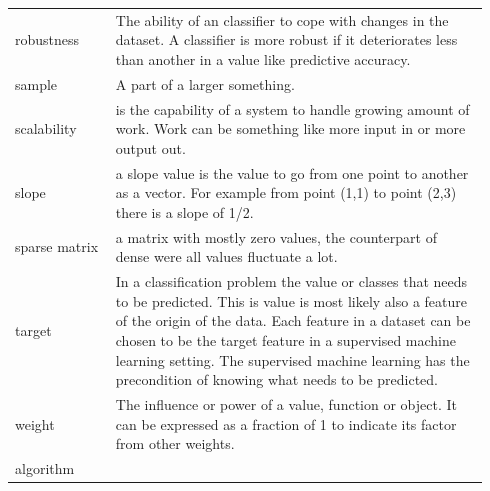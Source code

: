 \documentclass[a4paper,10pt]{article}
\begin{document}
\newpage
\begin{tabular}{ p{0.20\linewidth} p{0.7437\linewidth} }
	
	robustness &  The ability of an classifier to cope with changes in the dataset. A classifier is more robust if it deteriorates less than another in a value like predictive accuracy. \\ [1ex]	
	
	sample & A part of a larger something.\\ [1ex]
	
	scalability & is the capability of a system to handle growing amount of work. Work can be something like more input in or more output out. \\[1ex]	
	
	slope & a slope value is the value to go from one point to another as a vector. For example from point (1,1) to point (2,3) there is a slope of 1/2.\\[1ex]
	
	sparse matrix & a matrix with mostly zero values, the counterpart of dense were all values fluctuate a lot.	\\ [1ex]
	
	target & In a classification problem the value or classes that needs to be predicted. This is value is most likely also a feature of the origin of the data. Each feature in a dataset can be chosen to be the target feature in a supervised machine learning setting. The supervised machine learning has the precondition of knowing what needs to be predicted. \\ [+1ex]	
	
	weight & The influence or power of a value, function or object. It can be expressed as a fraction of 1 to indicate its factor from other weights.	\\ [1ex]
	
	
	
	
	
	
	algorithm & \\ [1ex]	
	\end{tabular}
\end{document}
